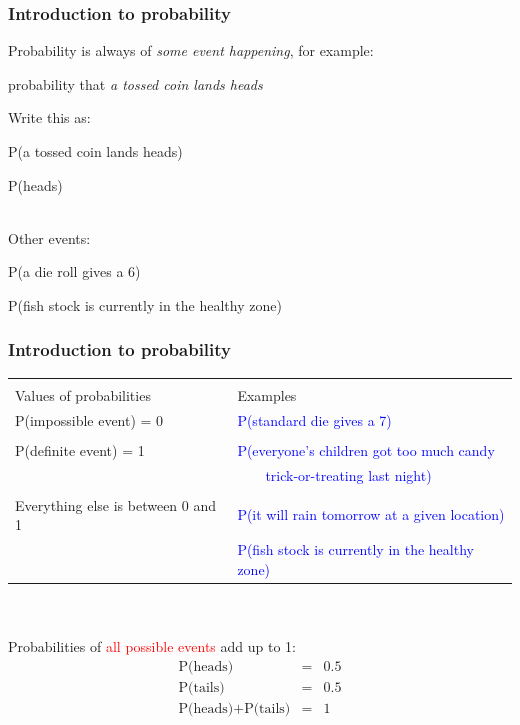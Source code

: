 \begin{frame}
\frametitle{Introduction to probability}

Probability is always of \alert{\emph{some event happening}}, for example:

\bi
\item probability that \alert{\emph{a tossed coin lands heads}}
\ei

Write this as:

\bi
\item P(a tossed coin lands heads)
\item P(heads)
\ei

\pause

~\\

Other events:
\bi
\item P(a die roll gives a 6)
\item P(fish stock is currently in the healthy zone)
\ei

\end{frame}


\begin{frame}
\frametitle{Introduction to probability}

\begin{tabular}{ll}
  & \\
Values of probabilities  & Examples \\
  \hline
P(impossible event) = 0 & \textcolor{blue}{P(standard die gives a 7)} \\
  & \\
P(definite event) = 1 & \textcolor{blue}{P(everyone's children got too much candy}\\
  &                     \textcolor{blue}{~~~~trick-or-treating last night)} \\
  & \\
Everything else is between 0 and 1 & \textcolor{blue}{P(it will rain tomorrow at a given location)}\\
                                   & \textcolor{blue}{P(fish stock is currently in the healthy zone)}
\end{tabular}

\pause

~\\

~\\

Probabilities of \textcolor{red}{all possible events} add up to 1:
\begin{eqnarray}
\nonumber \mbox{P(heads)} & = & 0.5\\
\nonumber \mbox{P(tails)} & = & 0.5\\
\nonumber \mbox{P(heads)} + \mbox{P(tails)} & = & 1
\end{eqnarray}
\end{frame}

